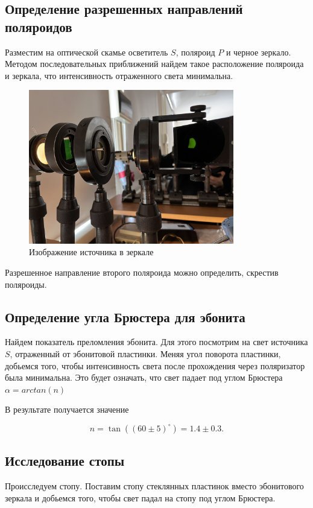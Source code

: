 \subsection*{Определение разрешенных направлений поляроидов}
Разместим на оптической скамье осветитель $S$, поляроид $P$ и черное зеркало. Методом последовательных приближений найдем такое расположение поляроида и зеркала, что интенсивность отраженного света минимальна.

\begin{figure}[H]
\centering
\includegraphics[width=0.80\textwidth]{IMG_3187.JPG}
\caption{Изображение источника в зеркале}
\end{figure}

Разрешенное направление второго поляроида можно определить, скрестив поляроиды.

\subsection*{Определение угла Брюстера для эбонита}
Найдем показатель преломления эбонита. Для этого посмотрим на свет источника $S$, отраженный от эбонитовой пластинки. Меняя угол поворота пластинки, добьемся того, чтобы интенсивность света после прохождения через поляризатор была минимальна. Это будет означать, что свет падает под углом Брюстера $\alpha = arctan(n)$

В результате получается значение

\[n=\tan((60 \pm 5)^\circ)=1.4\pm0.3.\]

\subsection*{Исследование стопы}
Происследуем стопу. Поставим стопу стеклянных пластинок вместо эбонитового зеркала и добьемся того, чтобы свет падал на стопу под углом Брюстера.

